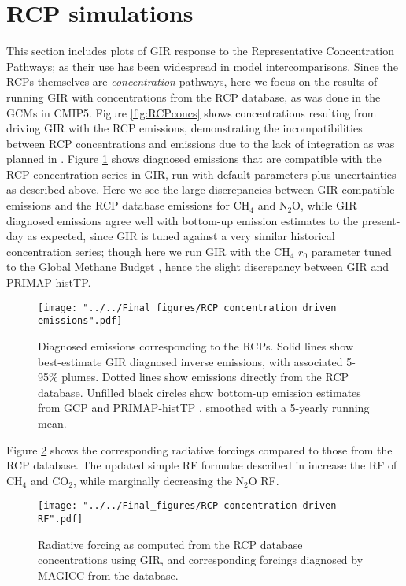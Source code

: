 \documentclass[gmd, manuscript]{copernicus}
\begin{document}
\section{RCP simulations}
This section includes plots of GIR response to the Representative Concentration Pathways; as their use has been widespread in model intercomparisons. Since the RCPs themselves are \emph{concentration} pathways, here we focus on the results of running GIR with concentrations from the RCP database, as was done in the GCMs in CMIP5. Figure \ref{fig:RCPconcs} shows concentrations resulting from driving GIR with the RCP emissions, demonstrating the incompatibilities between RCP concentrations and emissions due to the lack of integration as was planned in \cite{Moss2010}. Figure \ref{fig:RCPemms} shows diagnosed emissions that are compatible with the RCP concentration series in GIR, run with default parameters plus uncertainties as described above. Here we see the large discrepancies between GIR compatible emissions and the RCP database emissions for CH$_4$ and N$_2$O, while GIR diagnosed emissions agree well with bottom-up emission estimates to the present-day as expected, since GIR is tuned against a very similar historical concentration series; though here we run GIR with the CH$_4$ $r_0$ parameter tuned to the Global Methane Budget \citep{Saunois}, hence the slight discrepancy between GIR and PRIMAP-histTP.
\begin{figure}[t]
    \texttt{[image: "../../Final\_figures/RCP concentration driven emissions".pdf]}
    \caption{Diagnosed emissions corresponding to the RCPs. Solid lines show best-estimate GIR diagnosed inverse emissions, with associated 5-95\% plumes. Dotted lines show emissions directly from the RCP database. Unfilled black circles show bottom-up emission estimates from GCP and PRIMAP-histTP \citep{Quere2018,Gutschow2016}, smoothed with a 5-yearly running mean.}
    \label{fig:RCPemms}
\end{figure}
\clearpage
Figure \ref{fig:RCPRF} shows the corresponding radiative forcings compared to those from the RCP database. The updated simple RF formulae described in \cite{Etminan2016} increase the RF of CH$_4$ and CO$_2$, while marginally decreasing the N$_2$O RF.
\begin{figure}[t]
    \texttt{[image: "../../Final\_figures/RCP concentration driven RF".pdf]}
    \caption{Radiative forcing as computed from the RCP database concentrations using GIR, and corresponding forcings diagnosed by MAGICC from the database.}
    \label{fig:RCPRF}
\end{figure}
\end{document}
